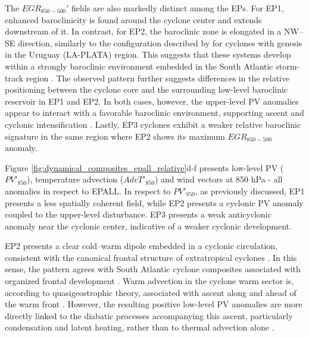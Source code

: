 \documentclass[pdflatex,sn-chicago]{sn-jnl}%
\theoremstyle{plain}
\theoremstyle{definition}
\theoremstyle{remark}
\theoremstyle{definition}
\begin{document}
The $EGR_{850-500}'$ fields are also markedly distinct among the EPs. For EP1, enhanced baroclinicity is found around the cyclone center and extends downstream of it. In contrast, for EP2, the baroclinic zone is elongated in a NW--SE direction, similarly to the configuration described by \citet{crespo2021potential} for cyclones with genesis in the Uruguay (LA-PLATA) region. This suggests that these systems develop within a strongly baroclinic environment embedded in the South Atlantic storm-track region \citep{hoskins1990existence,chang2002storm,hoskins2005new}. The observed pattern further suggests differences in the relative positioning between the cyclone core and the surrounding low-level baroclinic reservoir in EP1 and EP2. In both cases, however, the upper-level PV anomalies appear to interact with a favorable baroclinic environment, supporting ascent and cyclonic intensification \citep{davis1991potential,huo1999interaction,besson2021global,crespo2021potential}. Lastly, EP3 cyclones exhibit a weaker relative baroclinic signature in the same region where EP2 shows its maximum $EGR_{850-500}$ anomaly.
 

Figure \ref{fig:dynamical_composites_epall_relative}d-f presents low-level PV ($PV'_{850}$), temperature advection ($AdvT'_{850}$) and wind vectors at 850 hPa - all anomalies in respect to EPALL. In respect to $PV'_{850}$, as previously discussed, EP1 presents a less spatially coherent field, while EP2 presents a cyclonic PV anomaly coupled to the upper-level disturbance. EP3 presents a weak anticyclonic anomaly near the cyclonic center, indicative of a weaker cyclonic development.

EP2 presents a clear cold--warm dipole embedded in a cyclonic circulation, consistent with the canonical frontal structure of extratropical cyclones \citep[e.g.][]{dacre2025kinematic}. In this sense, the pattern agrees with South Atlantic cyclone composites associated with organized frontal development \citep{gramcianinov2019properties}. Warm advection in the cyclone warm sector is, according to quasigeostrophic theory, associated with ascent along and ahead of the warm front \citep{davies2015quasigeostrophic}. However, the resulting positive low-level PV anomalies are more directly linked to the diabatic processes accompanying this ascent, particularly condensation and latent heating, rather than to thermal advection alone \citep{hoskins1985use,huo1999interaction,attinger2021systematic}.
\end{document}
